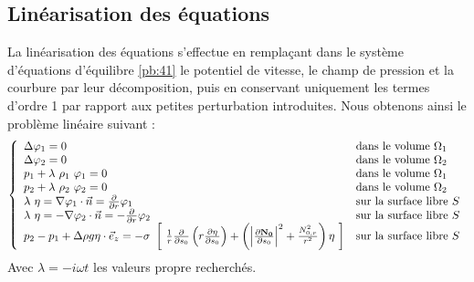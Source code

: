 \documentclass[a4paper]{report}
\begin{document}
\subsection{Linéarisation des équations}
La linéarisation des équations s'effectue en remplaçant dans le système d'équations d'équilibre \eqref{pb:41} le potentiel de vitesse, le champ de pression et la courbure par leur décomposition, puis en conservant uniquement les termes d'ordre 1 par rapport aux petites perturbation introduites. Nous obtenons ainsi le problème linéaire suivant :
\begin{eqnarray}\label{pb:42}         %
\left\{                              %
\begin{array}{lll}                   %
\Delta \varphi_1 = 0                                                                                     & \text{dans le volume $\Omega_1$}    \\%
\Delta \varphi_2 = 0                                                                                     & \text{dans le volume $\Omega_2$}    \\%
p_1 + \lambda\ \rho_1\ \varphi_1 = 0                                                                     & \text{dans le volume $\Omega_1$}    \\%
p_2 + \lambda\ \rho_2\ \varphi_2 = 0                                                                     & \text{dans le volume $\Omega_2$}    \\%
\lambda\ \eta = \nabla \varphi_1 \cdot \vec{n} = \frac{\partial}{\partial r} \varphi_1                   & \text{sur la surface libre $S$}      \\
\lambda\ \eta = - \nabla \varphi_2 \cdot \vec{n} = - \frac{\partial}{\partial r} \varphi_2               & \text{sur la surface libre $S$}      \\
p_2 -p_1 + \Delta{\rho} g \eta \cdot \vec{e}_z = - \sigma\ \left[\
\frac{1}{r} \frac{\partial}{\partial s_0} \left( r \frac{\partial \eta}{\partial s_0} \right)
+
\left( \left| \frac{\partial \bf N_0}{\partial s_0} \right|^2  + \frac{N_{0,r}^2}{r^2} \right) \eta
\ \right]                                                                                                & \text{sur la surface libre $S$}   %
\end{array}                          %
\right.                              %
\end{eqnarray}                       %
Avec $\lambda = - i \omega t$ les valeurs propre recherchés.
\newpage
\end{document}

